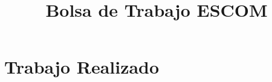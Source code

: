 \documentclass[11pt, twopages]{book}
\date{}
\title{Bolsa de Trabajo ESCOM}
\author{}
\begin{document}
    \frontmatter
        \maketitle
        \tableofcontents
        \listoffigures
        \listoftables
    \mainmatter
    


    

    
    \chapter{Trabajo Realizado}
    \label{sprints}
       
       
       
       
       
       
       
    
    
        
    \appendix

        
        
        
        
        
        

    \medskip

    \printbibliography
        \printbibliography
\end{document}
